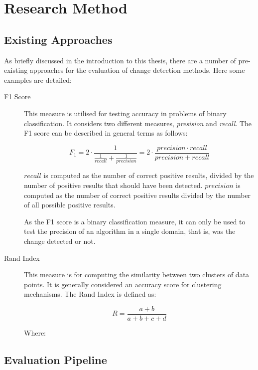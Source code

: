 \documentclass{uvamscse}	%
\begin{document}
\chapter{Research Method}

\section{Existing Approaches}

As briefly discussed in the introduction to this thesis, there are a number of pre-existing approaches for the evaluation of change detection methods. Here some examples are detailed:

\begin{description}
	\item[F1 Score] This measure is utilised for testing accuracy in problems of binary classification. It considers two	different measures, \emph{presision} and \emph{recall}. The F1 score can be described in general terms as follows:

	\begin{equation}
		F_1 = 2 \cdot \frac{1}{\frac{1}{recall} + \frac{1}{precision}} = 2 \cdot \frac{precision \cdot recall}{precision+recall}
	\end{equation}

	$recall$ is computed as the number of correct positive results, divided by the number of positive results that should have been detected. $precision$ is computed as the number of correct positive results divided by the number of all possible positive results.

	As the F1 score is a binary classification measure, it can only be used to test the precision of an algorithm in a single domain, that is, was the change detected or not.

	\item[Rand Index] This measure is for computing the similarity between two clusters of data points. It is generally	considered an accuracy score for clustering mechanisms. The Rand Index is defined as:

	\begin{equation}
		R = \frac{a+b}{a+b+c+d}
	\end{equation}

	Where:

\end{description}

\section{Evaluation Pipeline}
\end{document}

